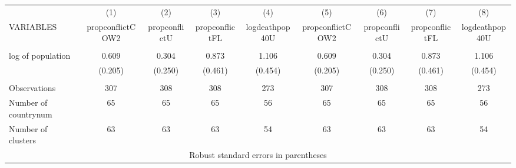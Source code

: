\begin{tabular}{lcccccccc} \hline
 & (1) & (2) & (3) & (4) & (5) & (6) & (7) & (8) \\
VARIABLES & propconflictCOW2 & propconflictU & propconflictFL & logdeathpop40U & propconflictCOW2 & propconflictU & propconflictFL & logdeathpop40U \\ \hline
 &  &  &  &  &  &  &  &  \\
log of population & 0.609 & 0.304 & 0.873 & 1.106 & 0.609 & 0.304 & 0.873 & 1.106 \\
 & (0.205) & (0.250) & (0.461) & (0.454) & (0.205) & (0.250) & (0.461) & (0.454) \\
 &  &  &  &  &  &  &  &  \\
Observations & 307 & 308 & 308 & 273 & 307 & 308 & 308 & 273 \\
Number of countrynum & 65 & 65 & 65 & 56 & 65 & 65 & 65 & 56 \\
 Number of clusters & 63 & 63 & 63 & 54 & 63 & 63 & 63 & 54 \\ \hline
\multicolumn{9}{c}{ Robust standard errors in parentheses} \\
\end{tabular}
